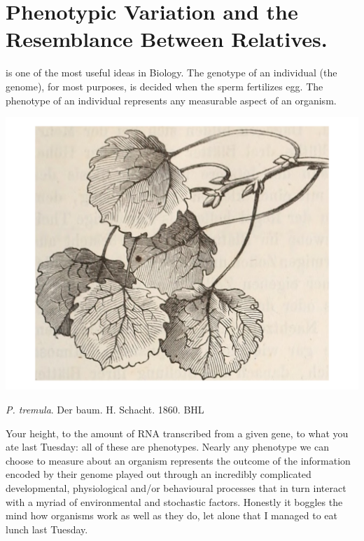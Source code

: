 \chapter{Phenotypic Variation and the Resemblance Between Relatives.}

 is one of the most useful ideas in Biology.\cite{Johannsen:1911} 
The genotype of an individual (the genome), for most purposes, is decided when
the sperm fertilizes egg. The phenotype of an individual represents any
measurable aspect of an organism. \begin{marginfigure}
\begin{center}
\includegraphics[width=0.8 \textwidth]{illustration_images/Quant_gen/Aspen_budset/Aspen_leaves.pdf}
\end{center}
\caption{{\it P. tremula}. Der baum. H. Schacht. 1860. BHL } \label{fig:Apsen_geno_pheno}
\end{marginfigure}   Your height, to the amount of
RNA transcribed from a given gene, to what you ate last Tuesday: all
of these are phenotypes.  Nearly any phenotype we can choose to measure about an organism represents the outcome of the information encoded by their genome played out through an incredibly complicated
developmental, physiological and/or behavioural processes that in turn interact with a myriad of environmental and
stochastic factors. Honestly it boggles the mind how organisms work as well as they do, let alone that I managed to eat lunch last Tuesday. 

